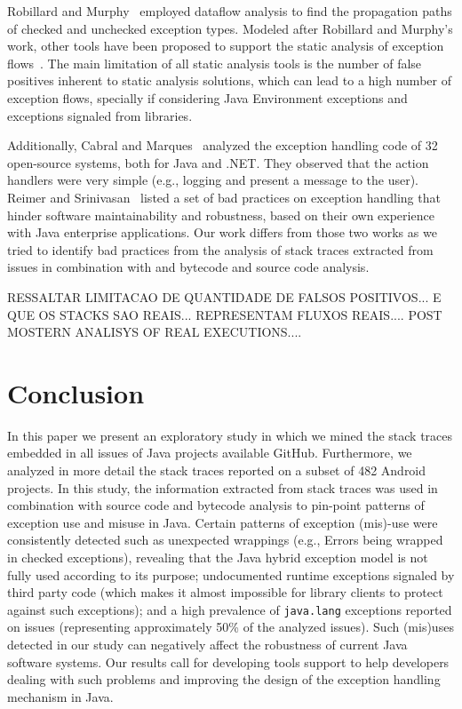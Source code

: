 \documentclass[conference]{IEEEtran}
\begin{document}
Robillard and Murphy~\cite{Robil00}
employed dataflow analysis to find the propagation paths of checked and
unchecked exception types. Modeled after Robillard and Murphy's work, other
tools have been proposed to support the static analysis of exception
flows~\cite{coelho2008assessing}. The main limitation of all
static analysis tools is the number of false positives inherent to static analysis
solutions, which can lead to a high number of exception flows, specially if
considering Java Environment exceptions and exceptions signaled from libraries.
 
Additionally, Cabral and Marques~\cite{cabral2007exception} analyzed the
exception handling code of 32 open-source systems, both for Java and .NET. They
observed that the action handlers were very simple (e.g., logging and present a
message to the user). Reimer and Srinivasan~\cite{reimer2003analyzing} listed a
set of bad practices on exception handling that hinder software maintainability
and robustness, based on their own experience with Java enterprise applications.
Our work differs from those two works as we tried to identify bad practices from
the analysis of stack traces extracted from issues in combination with and bytecode and source
code analysis. 

RESSALTAR LIMITACAO DE QUANTIDADE DE FALSOS POSITIVOS... E QUE OS STACKS SAO REAIS...
REPRESENTAM FLUXOS REAIS.... POST MOSTERN ANALISYS OF REAL EXECUTIONS....

\enlargethispage{-2\baselineskip}

\section{Conclusion}

In this paper we present an exploratory study in which we mined the stack 
traces embedded in all issues of Java projects available GitHub.
Furthermore, we analyzed in more detail the
stack traces reported on a subset of 482 Android projects. In this study, the information extracted 
from stack traces was used in combination with source code and bytecode analysis to 
pin-point patterns of exception use and misuse in Java.
Certain patterns of exception
(mis)-use were consistently detected such as unexpected wrappings (e.g., Errors
being wrapped in checked exceptions), revealing that  the Java hybrid exception
model is not fully used according to its purpose; undocumented runtime
exceptions signaled by third party code (which makes it almost impossible for
library clients to protect against such exceptions); 
and a high prevalence of
\texttt{java.lang} exceptions reported on issues (representing approximately 50\% of the
analyzed issues). Such (mis)uses detected in our study can negatively affect the 
robustness of current Java software systems. Our results call for  
 developing tools support to help developers dealing with such problems and 
improving the design of the exception handling mechanism in Java.
\end{document}
